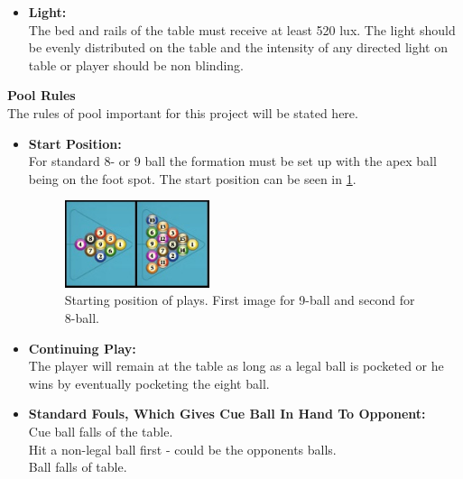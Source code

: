 \begin{itemize}
		
	\item \textbf{Light:}\\
		The bed and rails of the table must receive at least 520 lux. The light should be evenly distributed on the table and the intensity of any directed light on table or player should be non blinding.
\end{itemize}

\textbf{Pool Rules}\\
The rules of pool important for this project will be stated here.

\begin{itemize}
	\item \textbf{Start Position:}\\
		For standard 8- or 9 ball the formation must be set up with the apex ball being on the foot spot. The start position can be seen in \ref{fig:poolstart}.\\
		
\begin{figure}[H]
\begin{center}
\leavevmode
\includegraphics[width=0.4\textwidth]{images/poolstart.jpg}
\end{center}
\caption{Starting position of plays. First image for 9-ball and second for 8-ball.}
\label{fig:poolstart}
\end{figure}

	\item \textbf{Continuing Play:}\\
		The player will remain at the table as long as a legal ball is pocketed or he wins by eventually pocketing the eight ball.\\
		
	\item \textbf{Standard Fouls, Which Gives Cue Ball In Hand To Opponent:}\\
		Cue ball falls of the table.\\
		Hit a non-legal ball first - could be the opponents balls.\\
		Ball falls of table.\\
		

\end{itemize}
